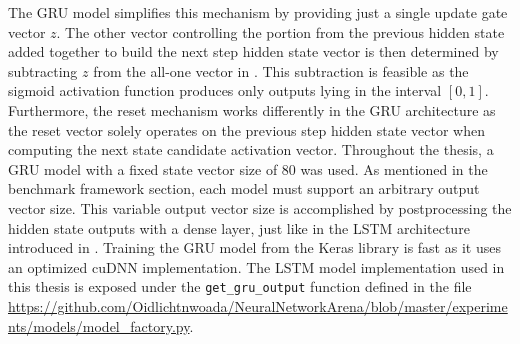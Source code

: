\documentclass[draft,final]{vutinfth} %
\begin{document}
    The GRU model simplifies this mechanism by providing just a single update gate vector $z$.
    The other vector controlling the portion from the previous hidden state added together to build the next step hidden state vector is then determined by subtracting $z$ from the all-one vector in .
    This subtraction is feasible as the sigmoid activation function produces only outputs lying in the interval $[0,1]$.
    Furthermore, the reset mechanism works differently in the GRU architecture as the reset vector solely operates on the previous step hidden state vector when computing the next state candidate activation vector.
    Throughout the thesis, a GRU model with a fixed state vector size of $80$ was used. As mentioned in the benchmark framework section, each model must support an arbitrary output vector size.
    This variable output vector size is accomplished by postprocessing the hidden state outputs with a dense layer, just like in the LSTM architecture introduced in .
    Training the GRU model from the Keras library is fast as it uses an optimized cuDNN \cite{cuDNN} implementation.
    The LSTM model implementation used in this thesis is exposed under the \texttt{get\_gru\_output} function defined in the file \url{https://github.com/Oidlichtnwoada/NeuralNetworkArena/blob/master/experiments/models/model_factory.py}.
\end{document}
